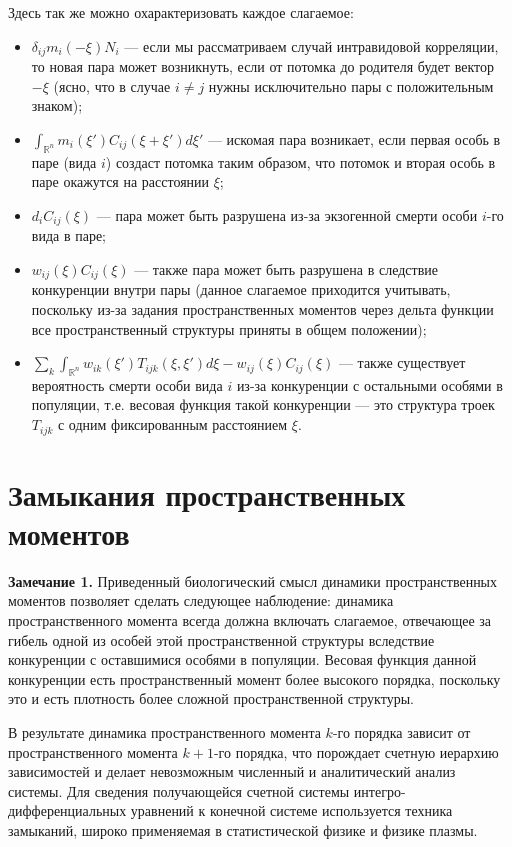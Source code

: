 Здесь так же можно охарактеризовать каждое слагаемое:
\begin{itemize}
	\item $ \delta_{ij}m_{i}(-\xi)N_{i} $ --- если мы рассматриваем случай  интравидовой корреляции, то новая пара может возникнуть, если от потомка до родителя будет вектор $-\xi$ (ясно, что в случае $i \ne j$ нужны исключительно пары с положительным знаком);
	
	\item  $ \int_{\mathbb{\mathbb{R}}^{n}}m_{i}(\xi')C_{ij}(\xi+\xi')d\xi' $ --- искомая пара возникает, если первая особь в паре (вида $i$) создаст потомка таким образом, что потомок и вторая особь в паре окажутся на расстоянии $\xi$;
	
	\item $ d_{i}C_{ij}(\xi) $ --- пара может быть разрушена из-за экзогенной смерти особи $i$-го вида в паре;
	
	\item $ w_{ij}(\xi)C_{ij}(\xi) $ --- также пара может быть разрушена в следствие конкуренции внутри пары (данное слагаемое приходится учитывать, поскольку из-за задания пространственных моментов через дельта функции все пространственный структуры приняты в общем положении);
	
	\item  $ \sum_{k}\int_{\mathbb{\mathbb{R}}^{n}}w_{ik}(\xi')T_{ijk}(\xi,\xi')d\xi-w_{ij}(\xi)C_{ij}(\xi) $ --- также существует вероятность смерти особи вида $i$ из-за конкуренции с остальными особями в популяции, т.е. весовая функция такой конкуренции --- это структура троек $ T_{ijk} $ с одним фиксированным расстоянием  $\xi$.
\end{itemize}

\section{Замыкания пространственных моментов}

\textbf{Замечание 1.} Приведенный биологический смысл динамики пространственных моментов позволяет сделать следующее наблюдение: динамика пространственного момента всегда должна включать слагаемое, отвечающее за гибель одной из особей этой пространственной структуры вследствие конкуренции с оставшимися особями в популяции. Весовая функция данной конкуренции есть пространственный момент более высокого порядка, поскольку это и есть плотность более сложной пространственной структуры.

В результате динамика пространственного момента $k$-го порядка зависит от пространственного момента $k+1$-го порядка, что порождает счетную иерархию зависимостей и делает невозможным численный и аналитический анализ системы. Для сведения получающейся счетной системы интегро-дифференциальных уравнений к конечной системе используется техника замыканий, широко применяемая в статистической физике и физике плазмы.

